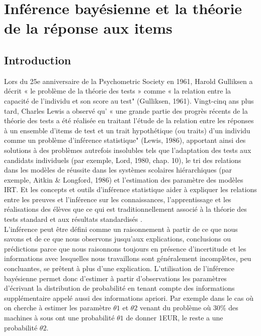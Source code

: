 \chapter{Inférence bayésienne et la théorie de la réponse aux items}
\minitoc
\thispagestyle{empty}
\newpage

\section{Introduction}
Lors du 25e anniversaire de la Psychometric Society en 1961, Harold Gulliksen a décrit « le problème de la théorie des tests » comme « la relation entre la capacité de l'individu et son score au test" (Gulliksen, 1961). Vingt-cinq ans plus tard, Charles Lewis a observé qu' « une grande partie des progrès récents de la théorie des tests a été réalisée en traitant l'étude de la relation entre les réponses à un ensemble d'items de test et un trait hypothétique (ou traits) d'un individu comme un problème d'inférence statistique" (Lewis, 1986), apportant ainsi des solutions à des problèmes autrefois insolubles tels que l'adaptation des tests aux candidats individuels (par exemple, Lord, 1980, chap. 10), le tri des relations dans les modèles de réussite dans les systèmes scolaires hiérarchiques (par exemple, Aitkin \& Longford, 1986) et l’estimation des paramètre des modèles IRT. Et les concepts et outils d'inférence statistique aider à expliquer les relations entre les preuves et l'inférence sur les connaissances, l'apprentissage et les réalisations des élèves que ce qui est traditionnellement associé à la théorie des tests standard et aux résultats standardisés \cite{mislevy1994evidence}. \\
L'inférence peut être défini comme un raisonnement à partir de ce que nous savons et de ce que nous observons jusqu'aux explications, conclusions ou prédictions parce que nous raisonnons toujours en présence d'incertitude et les informations avec lesquelles nous travaillons sont généralement incomplètes, peu concluantes, se prêtent à plus d’une explication. L’utilisation de l’inférence bayésienne permet donc d’estimer à partir d’observations les paramètres d’écrivant la distribution de probabilité en tenant compte des informations supplémentaire appelé aussi des informations apriori. Par exemple dans le cas où on cherche à estimer les paramètre \(\displaystyle \theta1 \) et \(\displaystyle \theta2 \) venant du problème où 30\% des machines à sous ont une probabilité \(\displaystyle \theta1 \)  de donner 1EUR, le reste a une probabilité \(\displaystyle \theta2 \).\\

